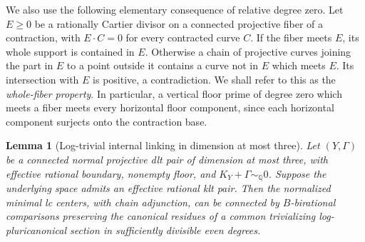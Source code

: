 \documentclass[11pt,letterpaper]{article}
\newtheorem{lemma}[theorem]{Lemma}
\theoremstyle{definition}
\theoremstyle{remark}
\begin{document}
We also use the following elementary consequence of relative
degree zero.  Let $E\ge0$ be a rationally Cartier divisor on a
connected projective fiber of a contraction, with $E\cdot C=0$
for every contracted curve $C$.  If the fiber meets $E$, its
whole support is contained in $E$.  Otherwise a chain of
projective curves joining the part in $E$ to a point outside
it contains a curve not in $E$ which meets $E$.  Its
intersection with $E$ is positive, a contradiction.  We shall
refer to this as the \emph{whole-fiber property}.  In particular,
a vertical floor prime of degree zero which meets a fiber
meets every horizontal floor component, since each horizontal
component surjects onto the contraction base.

\begin{lemma}[Log-trivial internal linking in dimension at most three]
\label{floor:trivial-linking}
Let $(Y,\Gamma)$ be a connected normal projective dlt pair of
dimension at most three, with effective rational boundary,
nonempty floor, and
$K_Y+\Gamma\sim_\mathbb{Q}0$.  Suppose the underlying space admits
an effective rational klt pair.  Then the normalized minimal
lc centers, with chain adjunction, can be connected by
$B$-birational comparisons preserving the canonical residues
of a common trivializing log-pluricanonical section in
sufficiently divisible even degrees.
\end{lemma}
\end{document}

